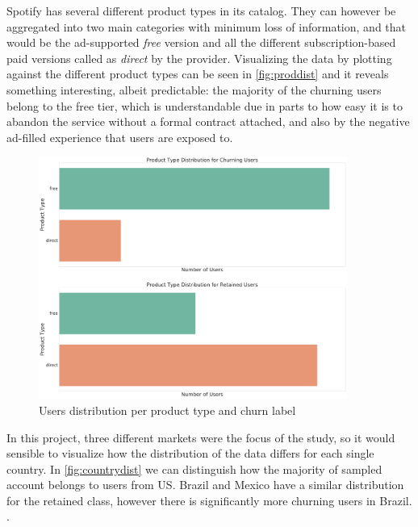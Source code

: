 \documentclass{kththesis}
\begin{document}
Spotify has several different product types in its catalog. They can however be aggregated into two main categories with minimum loss of information, and that would be the ad-supported \emph{free} version and all the different subscription-based paid versions called as \emph{direct} by the provider. Visualizing the data by plotting against the different product types can be seen in \autoref{fig:proddist} and it reveals something interesting, albeit predictable: the majority of the churning users belong to the free tier, which is understandable due in parts to how easy it is to abandon the service without a formal contract attached, and also by the negative ad-filled experience that users are exposed to. 

	\begin{figure}[H]
    \centering
    \includegraphics[width=0.9\textwidth,height=0.9\textheight,keepaspectratio]{figures/dist_product_type.pdf}
    \caption{Users distribution per product type and churn label}
    \label{fig:proddist}
	\end{figure}

In this project, three different markets were the focus of the study, so it would sensible to visualize how the distribution of the data differs for each single country. In \autoref{fig:countrydist} we can distinguish how the majority of sampled account belongs to users from US. Brazil and Mexico have a similar distribution for the retained class, however there is significantly more churning users in Brazil. .
\end{document}
